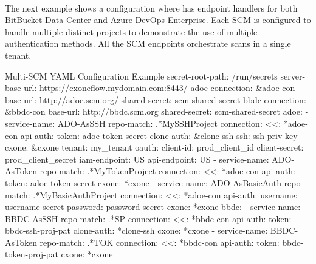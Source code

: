 \pagebreak
\noindent\\The next example shows a configuration where \cxoneflow has endpoint handlers for both
BitBucket Data Center and Azure DevOps Enterprise.  Each SCM is configured to handle multiple distinct
projects to demonstrate the use of multiple authentication methods.  All the SCM endpoints
orchestrate scans in a single \cxone tenant.

\begin{code}{Multi-SCM YAML Configuration Example}{}{}
secret-root-path: /run/secrets
server-base-url: https://cxoneflow.mydomain.com:8443/
adoe-connection: &adoe-con
    base-url: http://adoe.scm.org/
    shared-secret: scm-shared-secret
bbdc-connection: &bbdc-con
    base-url: http://bbdc.scm.org
    shared-secret: scm-shared-secret
adoe:
    - service-name: ADO-AsSSH
        repo-match: .*MySSHProject
        connection:
        <<: *adoe-con
        api-auth: 
            token: adoe-token-secret
        clone-auth: &clone-ssh
            ssh: ssh-priv-key
        cxone: &cxone
        tenant: my_tenant
        oauth:
            client-id: prod_client_id
            client-secret: prod_client_secret
        iam-endpoint: US
        api-endpoint: US
    - service-name: ADO-AsToken
        repo-match: .*MyTokenProject
        connection:
        <<: *adoe-con
        api-auth:
            token: adoe-token-secret
        cxone: *cxone
    - service-name: ADO-AsBasicAuth
        repo-match: .*MyBasicAuthProject
        connection:
        <<: *adoe-con
        api-auth:
            username: username-secret
            password: password-secret
        cxone: *cxone
bbdc:
    - service-name: BBDC-AsSSH
        repo-match: .*SP
        connection:
        <<: *bbdc-con
        api-auth: 
            token: bbdc-ssh-proj-pat
        clone-auth: *clone-ssh
        cxone: *cxone
    - service-name: BBDC-AsToken
        repo-match: .*TOK
        connection:
        <<: *bbdc-con
        api-auth:
            token: bbdc-token-proj-pat
        cxone: *cxone
\end{code}
